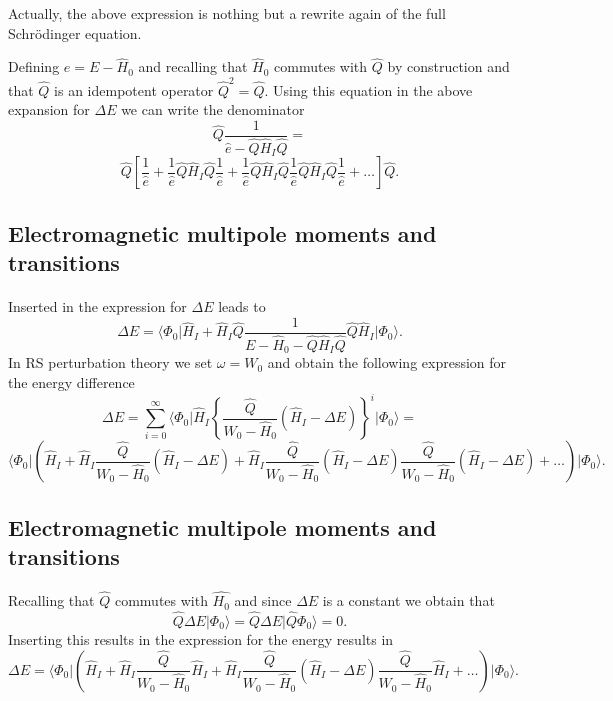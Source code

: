 \documentclass[%
oneside,                 %
final,                   %
10pt]{article}
\begin{document}
Actually, the above expression is nothing but a rewrite again of the full Schr\"odinger equation.


Defining $e=E-\hat{H}_0$ and recalling that $\hat{H}_0$ commutes with 
$\hat{Q}$ by construction and that $\hat{Q}$ is an idempotent operator
$\hat{Q}^2=\hat{Q}$. 
Using this equation in the above expansion for $\Delta E$ we can write the denominator 
\[
\hat{Q}\frac{1}{\hat{e}-\hat{Q}\hat{H}_I\hat{Q}}=
\]
\[
\hat{Q}\left[\frac{1}{\hat{e}}+\frac{1}{\hat{e}}\hat{Q}\hat{H}_I\hat{Q}
\frac{1}{\hat{e}}+\frac{1}{\hat{e}}\hat{Q}\hat{H}_I\hat{Q}
\frac{1}{\hat{e}}\hat{Q}\hat{H}_I\hat{Q}\frac{1}{\hat{e}}+\dots\right]\hat{Q}.
\]
\subsection{Electromagnetic multipole moments and transitions}

\paragraph{}
Inserted in the expression for $\Delta E$ leads to 
\[
\Delta E=
\langle \Phi_0\vert \hat{H}_I+\hat{H}_I\hat{Q}\frac{1}{E-\hat{H}_0-\hat{Q}\hat{H}_I\hat{Q}}\hat{Q}\hat{H}_I\vert \Phi_0\rangle. 
\]
In RS perturbation theory we set $\omega = W_0$ and obtain the following expression for the energy difference
\[
\Delta E=\sum_{i=0}^{\infty}\langle \Phi_0\vert \hat{H}_I\left\{\frac{\hat{Q}}{W_0-\hat{H}_0}\left(\hat{H}_I-\Delta E\right)\right\}^i\vert \Phi_0\rangle=
\]
\[
\langle \Phi_0\vert \left(\hat{H}_I+\hat{H}_I\frac{\hat{Q}}{W_0-\hat{H}_0}(\hat{H}_I-\Delta E)+
\hat{H}_I\frac{\hat{Q}}{W_0-\hat{H}_0}(\hat{H}_I-\Delta E)\frac{\hat{Q}}{W_0-\hat{H}_0}(\hat{H}_I-\Delta E)+\dots\right)\vert \Phi_0\rangle.
\]



\subsection{Electromagnetic multipole moments and transitions}

\paragraph{}
Recalling that $\hat{Q}$ commutes with $\hat{H_0}$ and since $\Delta E$ is a constant we obtain that
\[
\hat{Q}\Delta E\vert \Phi_0\rangle = \hat{Q}\Delta E\vert \hat{Q}\Phi_0\rangle = 0.
\]
Inserting this results in the expression for the energy results in
\[
\Delta E=\langle \Phi_0\vert \left(\hat{H}_I+\hat{H}_I\frac{\hat{Q}}{W_0-\hat{H}_0}\hat{H}_I+
\hat{H}_I\frac{\hat{Q}}{W_0-\hat{H}_0}(\hat{H}_I-\Delta E)\frac{\hat{Q}}{W_0-\hat{H}_0}\hat{H}_I+\dots\right)\vert \Phi_0\rangle.
\]
\end{document}
